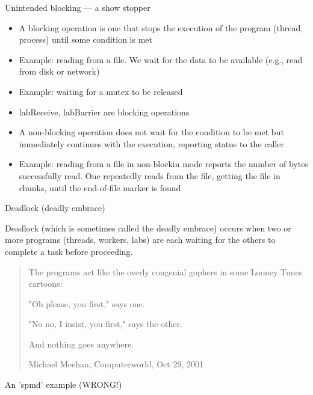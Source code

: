 \documentclass[pdflatex,colorlinks,landscape]{beamer}
\renewcommand\emph[1]{{\color{magenta}#1}}
\begin{document}
\begin{frame}{Unintended blocking --- a show stopper}
  \begin{itemize}
  \item A \emph{blocking operation} is one that stops
    the execution of the program (thread, process)
    until some condition is met
  \item Example: reading from a file. We wait for the
    data to be available (e.g., read from disk or network)
  \item Example: waiting for a mutex to be released
  \item \emph{labReceive, labBarrier} are blocking operations
  \item A \emph{non-blocking operation} does not wait for the
    condition to be met but immediately continues with the
    execution, reporting status to the caller
  \item Example: reading from a file in non-blockin mode reports the number
    of bytes successfully read. One repeatedly reads
    from the file, getting the file in chunks, until the end-of-file marker
    is found
  \end{itemize}
\end{frame}

\begin{frame}{Deadlock (deadly embrace)}
  \begin{definition}[Deadlock]
    \emph{Deadlock} (which is sometimes called \emph{the deadly
      embrace}) occurs when two or more programs (threads, workers,
    labs) are each waiting for the others to complete a task before
    proceeding.
  \end{definition}

  \begin{quote}
    The programs act like the overly congenial gophers in some Looney Tunes cartoons:

    "Oh please, you first," says one.

    "No no, I insist, you first," says the other.

    And nothing goes anywhere.

    \begin{tiny}
      \color{gray}
      Michael Meehan, Computerworld, Oct 29, 2001
    \end{tiny}
  \end{quote}
\end{frame}

\begin{frame}[allowframebreaks]{An 'spmd' example (WRONG!)}
  \begin{tiny}
    
  \end{tiny}
  \begin{tiny}
  \end{tiny}
\end{frame}
\end{document}
